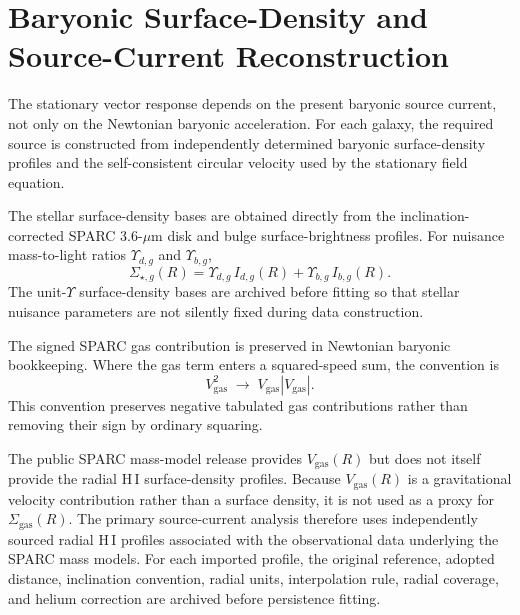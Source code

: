 \section{Baryonic Surface-Density and Source-Current Reconstruction}
\label{app:source-current}

The stationary vector response depends on the present baryonic source current,
not only on the Newtonian baryonic acceleration. For each galaxy, the required
source is constructed from independently determined baryonic surface-density
profiles and the self-consistent circular velocity used by the stationary
field equation.

The stellar surface-density bases are obtained directly from the
inclination-corrected SPARC 3.6-$\mu$m disk and bulge surface-brightness
profiles. For nuisance mass-to-light ratios $\Upsilon_{d,g}$ and
$\Upsilon_{b,g}$,
\begin{equation}
    \Sigma_{\star,g}(R)
    =
    \Upsilon_{d,g}\,I_{d,g}(R)
    +
    \Upsilon_{b,g}\,I_{b,g}(R).
    \label{eq:appI-stellar-surface-density}
\end{equation}
The unit-$\Upsilon$ surface-density bases are archived before fitting so that
stellar nuisance parameters are not silently fixed during data construction.

The signed SPARC gas contribution is preserved in Newtonian baryonic
bookkeeping. Where the gas term enters a squared-speed sum, the convention is
\begin{equation}
    V_{\mathrm{gas}}^2
    \;\longrightarrow\;
    V_{\mathrm{gas}}\left|V_{\mathrm{gas}}\right|.
    \label{eq:appI-signed-gas-speed}
\end{equation}
This convention preserves negative tabulated gas contributions rather than
removing their sign by ordinary squaring.

The public SPARC mass-model release provides $V_{\mathrm{gas}}(R)$ but does
not itself provide the radial H\,I surface-density profiles. Because
$V_{\mathrm{gas}}(R)$ is a gravitational velocity contribution rather than a
surface density, it is not used as a proxy for $\Sigma_{\mathrm{gas}}(R)$.
The primary source-current analysis therefore uses independently sourced radial
H\,I profiles associated with the observational data underlying the SPARC mass
models. For each imported profile, the original reference, adopted distance,
inclination convention, radial units, interpolation rule, radial coverage, and
helium correction are archived before persistence fitting.

